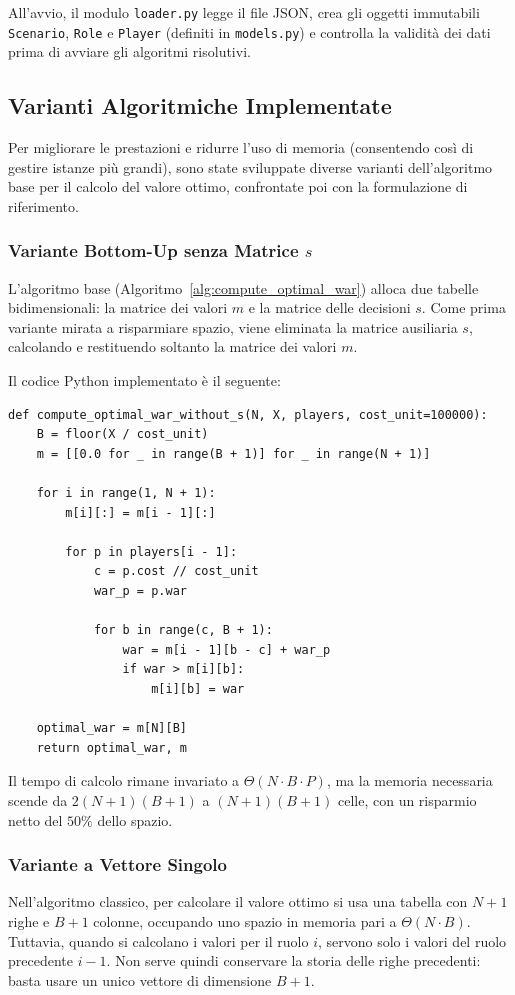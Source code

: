 All'avvio, il modulo \texttt{loader.py} legge il file JSON, crea gli oggetti immutabili \texttt{Scenario}, \texttt{Role} e \texttt{Player} (definiti in \texttt{models.py}) e controlla la validità dei dati prima di avviare gli algoritmi risolutivi.

\subsection{Varianti Algoritmiche Implementate}
Per migliorare le prestazioni e ridurre l'uso di memoria (consentendo così di gestire istanze più grandi), sono state sviluppate diverse varianti dell'algoritmo base per il calcolo del valore ottimo, confrontate poi con la formulazione di riferimento.

\subsubsection{Variante Bottom-Up senza Matrice \texorpdfstring{$s$}{s}}
L'algoritmo base (Algoritmo~\ref{alg:compute_optimal_war}) alloca due tabelle bidimensionali: la matrice dei valori $m$ e la matrice delle decisioni $s$. Come prima variante mirata a risparmiare spazio, viene eliminata la matrice ausiliaria $s$, calcolando e restituendo soltanto la matrice dei valori $m$.

Il codice Python implementato è il seguente:

\begin{lstlisting}
def compute_optimal_war_without_s(N, X, players, cost_unit=100000):
    B = floor(X / cost_unit)
    m = [[0.0 for _ in range(B + 1)] for _ in range(N + 1)]

    for i in range(1, N + 1):
        m[i][:] = m[i - 1][:]

        for p in players[i - 1]:
            c = p.cost // cost_unit
            war_p = p.war

            for b in range(c, B + 1):
                war = m[i - 1][b - c] + war_p
                if war > m[i][b]:
                    m[i][b] = war

    optimal_war = m[N][B]
    return optimal_war, m
\end{lstlisting}

Il tempo di calcolo rimane invariato a $\Theta(N \cdot B \cdot P)$, ma la memoria necessaria scende da $2(N + 1)(B + 1)$ a $(N + 1)(B + 1)$ celle, con un risparmio netto del $50\%$ dello spazio.

\subsubsection{Variante a Vettore Singolo}
Nell'algoritmo classico, per calcolare il valore ottimo si usa una tabella con $N+1$ righe e $B+1$ colonne, occupando uno spazio in memoria pari a $\Theta(N \cdot B)$. Tuttavia, quando si calcolano i valori per il ruolo $i$, servono solo i valori del ruolo precedente $i-1$. Non serve quindi conservare la storia delle righe precedenti: basta usare un unico vettore di dimensione $B+1$.

